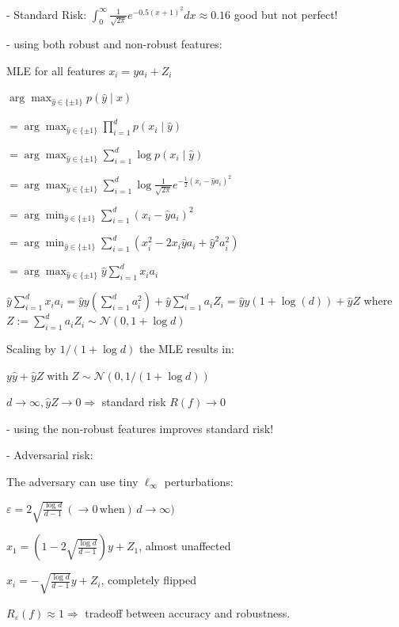 - Standard Risk: $\int_{0}^{\infty}{\frac{1}{\sqrt{2\pi}}}e^{-0.5(x+1)^{2}}d x\approx0.16$ good but not perfect!

- using both robust and non-robust features:

MLE for all features $x_{i}=y a_{i}+Z_{i}$

$\arg\operatorname*{max}_{{\hat{y}}\in\{\pm1\}}p({\hat{y}}\mid x)$

$=\arg\operatorname*{max}_{{\hat{y}}\in\{\pm1\}}\prod_{i=1}^{d}p(x_{i}\mid{\hat{y}})$

$=\arg\operatorname*{max}_{{\hat{y}}\in\{\pm1\}}\sum_{i=1}^{d}\log p(x_{i}\mid{\hat{y}})$

$=\arg\operatorname*{max}_{{\hat{y}}\in\{\pm1\}}\sum_{i=1}^{d}\log \frac{1}{\sqrt{2\pi}}e^{-\frac{1}{2}(x_{i}-\hat{y}a_{i})^{2}}$

$=\arg\operatorname*{min}_{{\hat{y}}\in\{\pm1\}}\sum_{i=1}^{d}(x_{i}-\hat{y}a_{i})^{2}$

$=\arg\operatorname*{min}_{{\hat{y}}\in\{\pm1\}}\sum_{i=1}^{d}(x_{i}^{2}-2x_{i}\hat{y}a_{i}+\hat{y}^{2}a_{i}^{2})$

$=\arg\operatorname*{max}_{\hat{y}\in\{\pm1\}}{\hat{y}}\sum_{i=1}^{d}x_{i}a_{i}$

${\hat{y}}\sum_{i=1}^{d}x_{i}a_{i}=\hat{y}y(\sum_{i=1}^{d}a_{i}^{2})+\hat{y}\sum_{i=1}^{d}a_{i}Z_{i}=\hat{y}y(1+\log(d))+\hat{y}Z$ where $Z:=\textstyle\sum_{i=1}^{d}a_{i}Z_{i}\sim{\mathcal{N}}(0,1+\log d)$

Scaling by $1/(1+\log d)$ the MLE results in:

$y{\hat{y}}+{\hat{y}}Z\operatorname{with}Z\sim{\mathcal{N}}(0,1/(1+\log d))$

$d\rightarrow\infty,{\hat{y}}Z\rightarrow0 \Rightarrow$ standard risk $R(f) \rightarrow 0$ 

- using the non-robust features improves standard risk!

- Adversarial risk:

The adversary can use tiny $\ell_\infty$ perturbations:

$\varepsilon=2\sqrt{\frac{\log d}{d-1}}\,(\to0\,\mathrm{when})\,d\to\infty)$

${\hat{x}}_{1}=\left(1-2\sqrt{\frac{\log d}{d-1}}\right)y+Z_{1}$, almost unaffected

$\hat{x}_{i}=-\sqrt{\frac{\log d}{d-1}}y+Z_{i}$, completely flipped

$R_{\varepsilon}(f) \approx 1 \Rightarrow$ tradeoff between accuracy and robustness.
